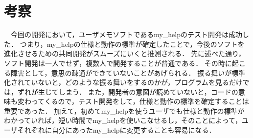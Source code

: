 \section{考察}
　今回の開発において，ユーザメモソフトであるmy\_helpのテスト開発は成功した．
つまり，my\_helpの仕様と動作の標準が確定したことで，今後のソフトを進化させるための共同開発がスムーズにいくと推測される．
先に述べた通り，ソフト開発は一人でせず，複数人で開発することが普通である．
その時に起こる障害として，意思の疎通ができていないことがあげられる．
振る舞いが標準化されていないと，どのような振る舞いをするのかが，プログラムを見るだけでは，ずれが生じてしまう．
また，開発者の意図が読めていないと，コードの意味も変わってくるので，テスト開発をして，仕様と動作の標準を確定することは重要であった．
加えて，初めてmy\_helpを使うユーザでも仕様と動作の標準がわかっていれば，短い時間でmy\_helpを使いこなせるし，そのことによって，ユーザそれぞれに自分にあったmy\_helpに変更することも容易になる．

